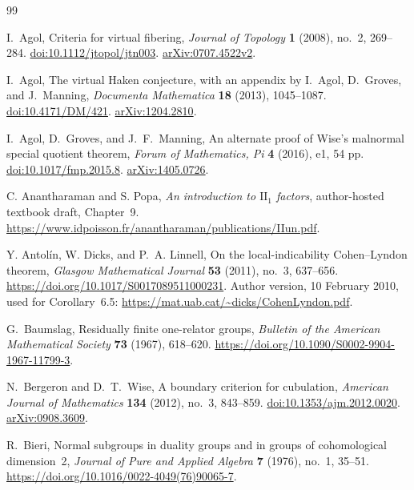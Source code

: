 \begin{thebibliography}{99}

I.~Agol,
Criteria for virtual fibering,
\emph{Journal of Topology} \textbf{1} (2008), no.~2, 269--284.
\href{https://doi.org/10.1112/jtopol/jtn003}{doi:10.1112/jtopol/jtn003}.
\href{https://arxiv.org/abs/0707.4522v2}{arXiv:0707.4522v2}.

I.~Agol,
The virtual Haken conjecture,
with an appendix by I.~Agol, D.~Groves, and J.~Manning,
\emph{Documenta Mathematica} \textbf{18} (2013), 1045--1087.
\href{https://doi.org/10.4171/DM/421}{doi:10.4171/DM/421}.
\href{https://arxiv.org/abs/1204.2810}{arXiv:1204.2810}.

I.~Agol, D.~Groves, and J.~F.~Manning,
An alternate proof of Wise's malnormal special quotient theorem,
\emph{Forum of Mathematics, Pi} \textbf{4} (2016), e1, 54 pp.
\href{https://doi.org/10.1017/fmp.2015.8}{doi:10.1017/fmp.2015.8}.
\href{https://arxiv.org/abs/1405.0726}{arXiv:1405.0726}.

C. Anantharaman and S. Popa,
\emph{An introduction to $\mathrm{II}_1$ factors},
author-hosted textbook draft, Chapter~9.
\url{https://www.idpoisson.fr/anantharaman/publications/IIun.pdf}.

Y. Antol\'in, W. Dicks, and P.~A. Linnell,
On the local-indicability Cohen--Lyndon theorem,
\emph{Glasgow Mathematical Journal} \textbf{53} (2011), no.~3, 637--656.
\url{https://doi.org/10.1017/S0017089511000231}.
Author version, 10 February 2010, used for Corollary~6.5:
\url{https://mat.uab.cat/~dicks/CohenLyndon.pdf}.

G.~Baumslag,
Residually finite one-relator groups,
\emph{Bulletin of the American Mathematical Society} \textbf{73} (1967),
618--620.
\url{https://doi.org/10.1090/S0002-9904-1967-11799-3}.

N.~Bergeron and D.~T.~Wise,
A boundary criterion for cubulation,
\emph{American Journal of Mathematics} \textbf{134} (2012), no.~3, 843--859.
\href{https://doi.org/10.1353/ajm.2012.0020}{doi:10.1353/ajm.2012.0020}.
\href{https://arxiv.org/abs/0908.3609}{arXiv:0908.3609}.

R.~Bieri,
Normal subgroups in duality groups and in groups of cohomological dimension~2,
\emph{Journal of Pure and Applied Algebra} \textbf{7} (1976), no.~1, 35--51.
\url{https://doi.org/10.1016/0022-4049(76)90065-7}.


\end{thebibliography}
